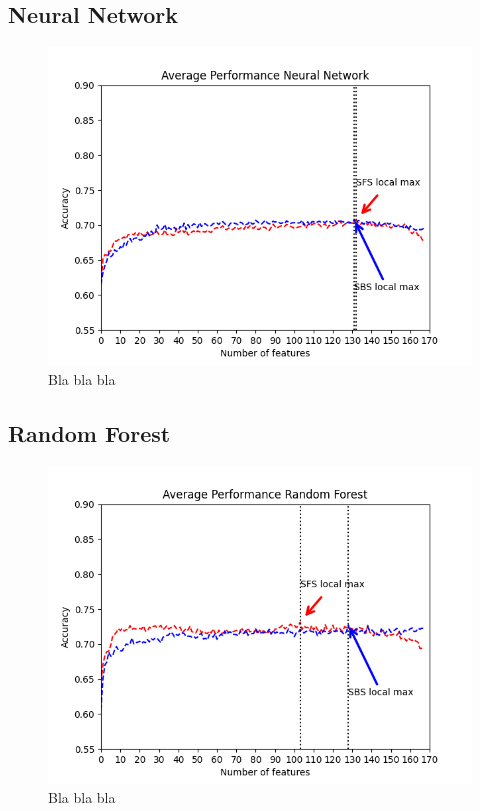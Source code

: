 \documentclass{kththesis}
\begin{document}
\subsection{Neural Network}

\begin{figure}
  \begin{center}
    \includegraphics[scale=0.8]{./figures/Figure_1.png}
    \caption{Bla bla bla}
  \end{center}
\end{figure}


\subsection{Random Forest}

\begin{figure}
  \begin{center}
    \includegraphics[scale=0.8]{./figures/Figure_4.png}
    \caption{Bla bla bla}
  \end{center}
\end{figure}
\end{document}
